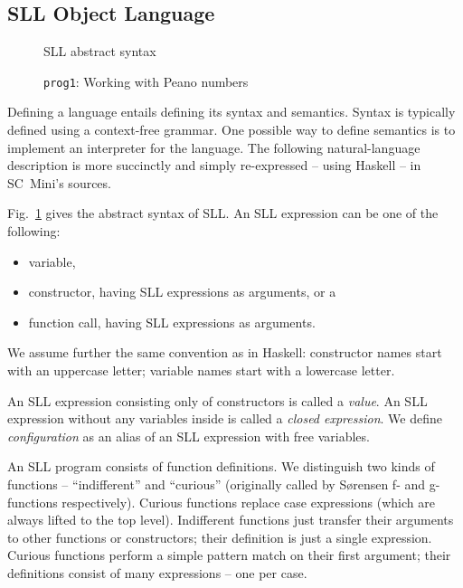 \subsection{SLL Object Language}
\label{sec-formalities}

\begin{figure}[t!]
\caption{SLL abstract syntax}

\label{fig-sll-syntax}
\end{figure}

\begin{figure}[t!]
\caption{\texttt{prog1}: Working with Peano numbers}
\label{fig:prog1}

\end{figure}

Defining a language entails defining its syntax and semantics. 
Syntax is typically defined using a context-free grammar.
One possible way to define semantics is to implement an interpreter for the language.
The following natural-language description is more succinctly and simply 
re-expressed -- using Haskell -- in SC~Mini's sources.

Fig.~\ref{fig-sll-syntax} gives the abstract syntax of SLL.
An SLL expression can be one of the following:
\begin{itemize}
  \item variable,
  \item constructor, having SLL expressions as arguments, or a
  \item function call, having SLL expressions as arguments.
\end{itemize}

We assume further the same convention as in Haskell: constructor names start
with an uppercase letter; variable names start with a lowercase letter.

An SLL expression consisting only of constructors is called a \emph{value}.
An SLL expression without any variables inside is called a \emph{closed expression}.
We define \emph{configuration} as an alias of an SLL expression with free variables.

An SLL program consists of function definitions.
We distinguish two kinds of functions -- ``indifferent'' and ``curious''
(originally called by S{\o}rensen f- and g-functions respectively).
Curious functions replace case expressions (which are always lifted to the top level).
Indifferent functions just transfer their arguments to other functions or constructors;
their definition is just a single expression.
Curious functions perform a simple pattern match on their first argument;
their definitions consist of many expressions -- one per case.

